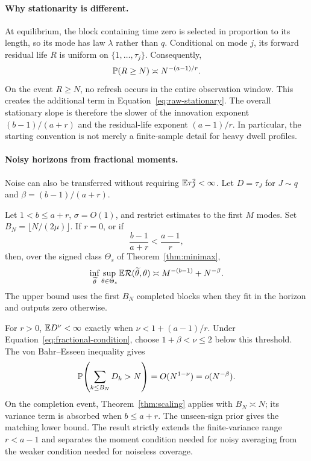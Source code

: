 \paragraph{Why stationarity is different.}
At equilibrium, the block containing time zero is selected in proportion to
its length, so its mode has law $\lambda$ rather than $q$.  Conditional on
mode $j$, its forward residual life $R$ is uniform on
$\{1,\ldots,\tau_j\}$.  Consequently,
\begin{equation}
\mathbb{P}(R\ge N)\mathrel{\asymp} N^{-(a-1)/r}.
\label{eq:residual-tail-main}
\end{equation}
On the event $R\ge N$, no refresh occurs in the entire observation window.
This creates the additional term in Equation~\eqref{eq:raw-stationary}.  The
overall stationary slope is therefore the slower of the innovation exponent
$(b-1)/(a+r)$ and the residual-life exponent $(a-1)/r$.  In particular, the
starting convention is not merely a finite-sample detail for heavy dwell
profiles.

\paragraph{Noisy horizons from fractional moments.}
Noise can also be transferred without requiring $\mathbb{E}\tau_J^2<\infty$.  Let
$D=\tau_J$ for $J\sim q$ and $\beta=(b-1)/(a+r)$.

\begin{theorem}
\label{thm:noisy-raw}
Let $1<b\le a+r$, $\sigma=O(1)$, and restrict estimates to the first $M$
modes.  Set $B_N=\lfloor N/(2\mu)\rfloor$.  If $r=0$, or if
\begin{equation}
\frac{b-1}{a+r}<\frac{a-1}{r},
\label{eq:fractional-condition}
\end{equation}
then, over the signed class $\Theta_s$ of Theorem~\ref{thm:minimax},
\begin{equation}
\inf_{\widetilde\theta}\sup_{\theta\in\Theta_s}
\mathbb{E}\mathcal{R}(\widetilde\theta,\theta)
\mathrel{\asymp} M^{-(b-1)}+N^{-\beta}.
\label{eq:noisy-raw-rate}
\end{equation}
The upper bound uses the first $B_N$ completed blocks when they fit in the
horizon and outputs zero otherwise.
\end{theorem}

For $r>0$, $\mathbb{E} D^\nu<\infty$ exactly when
$\nu<1+(a-1)/r$.  Under Equation~\eqref{eq:fractional-condition}, choose
$1+\beta<\nu\le2$ below this threshold.  The von Bahr--Esseen inequality gives
\begin{equation}
\mathbb{P}\!\left(\sum_{k\le B_N}D_k>N\right)
=O(N^{1-\nu})=o(N^{-\beta}).
\label{eq:completion-probability}
\end{equation}
On the completion event, Theorem~\ref{thm:scaling} applies with
$B_N\asymp N$; its variance term is absorbed when $b\le a+r$.  The unseen-sign
prior gives the matching lower bound.  The result strictly extends the
finite-variance range $r<a-1$ and separates the moment condition needed for
noisy averaging from the weaker condition needed for noiseless coverage.
